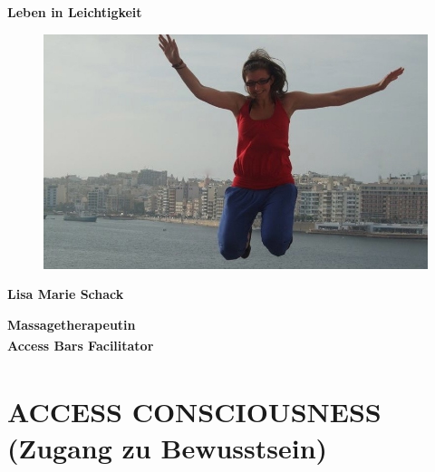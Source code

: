 \documentclass[10pt,foldmark,notumble]{leaflet}
\begin{document}
\newpage
\begin{center}
{\LARGE \bf Leben in Leichtigkeit}\\
\end{center}
\begin{figure}[h] %
\begin{center}
 \includegraphics [scale=.30]{Lisa_Sprung_neu.JPG}
 \end{center}
\end{figure}
\vspace*{20mm}
\begin{center}
{\Huge \bf Lisa Marie Schack}\\
\end{center}

\begin{center}
{\large \bf Massagetherapeutin \\ Access Bars\textsuperscript{\textregistered} Facilitator}\\
\end{center}
\vfill

\newpage

\section{ACCESS CONSCIOUSNESS \textsuperscript{\textregistered}\\
(Zugang zu Bewusstsein)}
\end{document}
